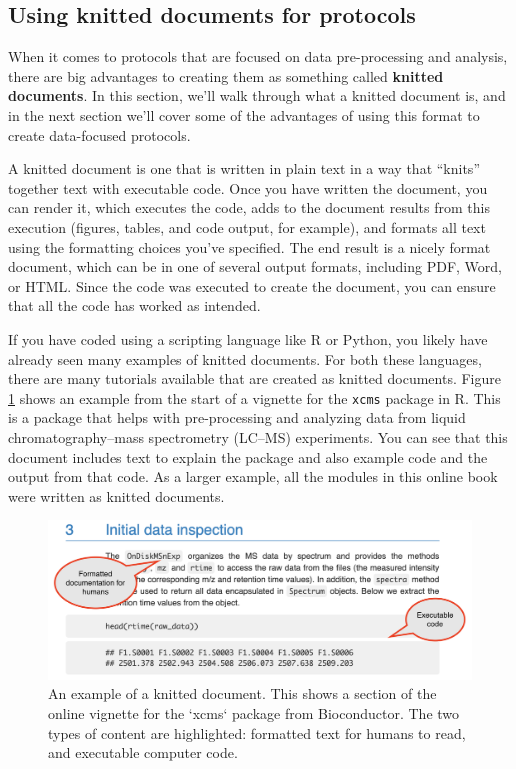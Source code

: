 \documentclass[]{tufte-book}
\begin{document}
\subsection{Using knitted documents for protocols}\label{using-knitted-documents-for-protocols}

When it comes to protocols that are focused on data pre-processing and
analysis, there are big advantages to creating them as something called
\textbf{knitted documents}. In this section, we'll walk through what a knitted
document is, and in the next section we'll cover some of the advantages of using this format to
create data-focused protocols.

A knitted document is one that is written in plain text in a way that ``knits''
together text with executable code. Once you have written the document, you can
render it, which executes the code, adds to the document results from this
execution (figures, tables, and code output, for example), and formats all text
using the formatting choices you've specified. The end result is a nicely format
document, which can be in one of several output formats, including PDF, Word, or
HTML. Since the code was executed to create the document, you can ensure that
all the code has worked as intended.

If you have coded using a scripting language like R or Python, you likely have
already seen many examples of knitted documents. For both these languages, there
are many tutorials available that are created as knitted documents. Figure
\ref{fig:xcmsexample} shows an example from the start of a vignette for the
\texttt{xcms} package in R. This is a package that helps with pre-processing and
analyzing data from liquid chromatography--mass spectrometry (LC--MS)
experiments. You can see that this document includes text to explain the package
and also example code and the output from that code.
As a larger example, all the modules in this online book were written as knitted
documents.

\begin{figure}
\includegraphics[width=\textwidth]{figures/vignette_example_annotated} \caption[An example of a knitted document]{An example of a knitted document. This shows a section of the online vignette for the `xcms` package from Bioconductor. The two types of content are highlighted: formatted text for humans to read, and executable computer code.}\label{fig:xcmsexample}
\end{figure}
\end{document}
